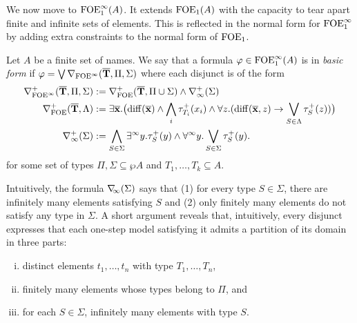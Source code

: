 
We now move to $\mathrm{FOE}^{\infty}_1(A)$. It extends $\mathrm{FOE}_1(A)$ with the capacity to tear apart finite and infinite sets of elements. This is reflected in the normal form for $\mathrm{FOE}^{\infty}_1$ by adding extra constraints to the normal form of $\mathrm{FOE}_1$.

\begin{definition}
Let $A$ be a finite set of names. We say that a formula $\varphi \in \mathrm{FOE}^{\infty}_1(A)$ is in \emph{basic form} if $\varphi = \bigvee \nabla_{\mathrm{FOE}^{\infty}}(\overline{{\mathbf{T}}},\Pi,\Sigma)$ where each disjunct is of the form
\begin{align*}
	\nabla^+_{\mathrm{FOE}^{\infty}}(\overline{{\mathbf{T}}},\Pi,\Sigma) &:= \nabla^+_{\mathrm{FOE}}(\overline{{\mathbf{T}}},\Pi \cup \Sigma) \land \nabla^+_\infty(\Sigma)\\
	\nabla^+_{\mathrm{FOE}}(\overline{{\mathbf{T}}},\Lambda) &:= \exists \overline{{\mathbf{x}}}.\big(\mathrm{diff}(\overline{{\mathbf{x}}}) \land \bigwedge_i \tau^{+}_{T_i}(x_i) \land \forall z.(\mathrm{diff}(\overline{{\mathbf{x}}},z) \to \bigvee_{S\in \Lambda} \tau^{+}_S(z))\big) \\
	\nabla^+_\infty(\Sigma) &:= \bigwedge_{S\in\Sigma} \exists^\infty y.\tau^{+}_S(y) \land \forall^\infty y.\bigvee_{S\in\Sigma} \tau^{+}_S(y) .
\end{align*}
for some set of types $\Pi,\Sigma \subseteq \wp A$ and $T_1, \dots, T_k \subseteq A$.
\end{definition}

Intuitively, the formula $\nabla_{\!\!\infty}(\Sigma)$ says that (1) for every type $S\in\Sigma$, there are infinitely many elements satisfying $S$ and (2) only finitely many elements do not satisfy any type in $\Sigma$. A short argument reveals that, intuitively, every disjunct expresses that each one-step model satisfying it admits a partition of its domain in three parts:
\begin{enumerate}[(i)]
 pt
\item distinct elements $t_1,\dots,t_n$ with type $T_1,\dots,T_n$,
\item finitely many elements whose types belong to $\Pi$, and
\item for each $S\in \Sigma$, infinitely many elements with type $S$.
\end{enumerate}


